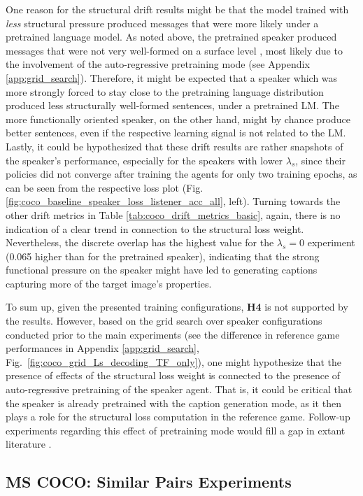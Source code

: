 One reason for the structural drift results might be that the model trained with \emph{less} structural pressure produced messages that were more likely under a pretrained language model. As noted above, the pretrained speaker produced messages that were not very well-formed on a surface level , most likely due to the involvement of the auto-regressive pretraining mode (see Appendix \ref{app:grid_search}). Therefore, it might be expected that a speaker which was more strongly forced to stay close to the pretraining language distribution produced less structurally well-formed sentences, under a pretrained LM. The more functionally oriented speaker, on the other hand, might by chance produce better sentences, even if the respective learning signal is not related to the LM. Lastly, it could be hypothesized that these drift results are rather snapshots of the speaker's performance, especially for the speakers with lower $\lambda_s$, since their policies did not converge after training the agents for only two training epochs, as can be seen from the respective loss plot (Fig. \ref{fig:coco_baseline_speaker_loss_listener_acc_all}, left). 
Turning towards the other drift metrics in Table \ref{tab:coco_drift_metrics_basic}, again, there is no indication of a clear trend in connection to the structural loss weight. Nevertheless, the discrete overlap has the highest value for the $\lambda_s = 0$ experiment (0.065 higher than for the pretrained speaker), indicating that the strong functional pressure on the speaker might have led to generating captions capturing more of the target image's properties.

To sum up, given the presented training configurations, \textbf{H4} is not supported by the results. However, based on the grid search over speaker configurations conducted prior to the main experiments (see the difference in reference game performances in Appendix \ref{app:grid_search}, Fig.~\ref{fig:coco_grid_Ls_decoding_TF_only}), one might hypothesize that the presence of effects of the structural loss weight is connected to the presence of auto-regressive pretraining of the speaker agent. That is, it could be critical that the speaker is already pretrained with the caption generation mode, as it then plays a role for the structural loss computation in the reference game. Follow-up experiments regarding this effect of pretraining mode would fill a gap in extant literature \parencite[but see][for related work]{lowe2020interaction}.

\subsection{MS COCO: Similar Pairs Experiments}
\label{expt:coco_similar_pairs}

